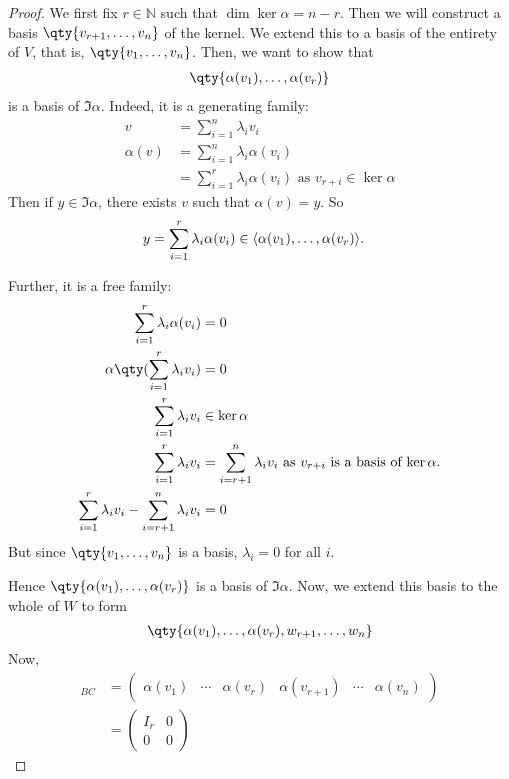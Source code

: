     \begin{proof}
        We first fix $r \in \mathbb N$ such that $\dim \ker \alpha = n - r$.
        Then we will construct a basis $\qty{v_{r+1}, \dots, v_n}$ of the kernel.
        We extend this to a basis of the entirety of $V$, that is, $\qty{v_1,\dots,v_n}$.
        Then, we want to show that
        \begin{align*}
            \qty{\alpha(v_1), \dots, \alpha(v_r)}
        \end{align*}
        is a basis of $\Im \alpha$.
        Indeed, it is a generating family:
        \begin{align*}
            v &= \sum_{i=1}^n \lambda_i v_i         \\
            \alpha(v) &= \sum_{i=1}^n \lambda_i \alpha(v_i) \\
            &= \sum_{i=1}^r \lambda_i \alpha(v_i) \text{ as $v_{r + i} \in \ker \alpha$}
        \end{align*}
        Then if $y \in \Im \alpha$, there exists $v$ such that $\alpha(v) = y$.
        So \begin{align*}
            y &= \sum_{i=1}^{r}  \lambda_i \alpha(v_i) \in \langle{} \alpha(v_1), \dots, \alpha(v_r) \rangle.
        \end{align*} 

        Further, it is a free family:
        \begin{align*}
            \sum_{i=1}^r \lambda_i \alpha(v_i) &= 0 \\
            \alpha\qty(\sum_{i=1}^r \lambda_i v_i) &= 0 \\
            \sum_{i=1}^r \lambda_i v_i & \in \ker \alpha \\
            \sum_{i=1}^r \lambda_i v_i &= \sum_{i=r+1}^n \lambda_i v_i \text{ as $v_{r + i}$ is a basis of $\ker \alpha$.}\\
            \sum_{i=1}^r \lambda_i v_i - \sum_{i=r+1}^n \lambda_i v_i &= 0
        \end{align*}
        But since $\qty{v_1, \dots, v_n}$ is a basis, $\lambda_i = 0$ for all $i$.

        Hence $\qty{\alpha(v_1), \dots, \alpha(v_r)}$ is a basis of $\Im \alpha$.
        Now, we extend this basis to the whole of $W$ to form
        \begin{align*}
            \qty{\alpha(v_1), \dots, \alpha(v_r), w_{r+1}, \dots, w_n}
        \end{align*}
        Now,
        \begin{align*}
            [\alpha]_{BC} & = \begin{pmatrix}
                \alpha(v_1) & \cdots & \alpha(v_r) & \alpha(v_{r+1}) & \cdots & \alpha(v_n)
            \end{pmatrix} \\
                        & = \begin{pmatrix}
                I_r & 0 \\
                0   & 0
            \end{pmatrix}
        \end{align*}
    \end{proof}
